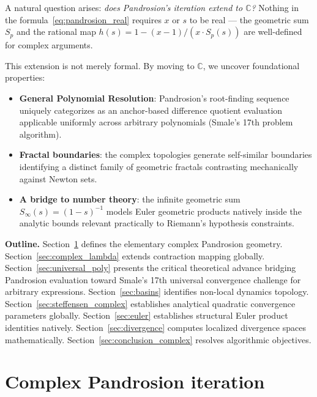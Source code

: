 \documentclass[11pt,a4paper]{article}
\theoremstyle{definition}
\newcommand{\CC}{\mathbb{C}}
\begin{document}
\medskip

A natural question arises: \emph{does Pandrosion's iteration extend to $\CC$?}  Nothing in the formula~\eqref{eq:pandrosion_real} requires $x$ or $s$ to be real --- the geometric sum $S_p$ and the rational map $h(s) = 1 - (x-1)/(x \cdot S_p(s))$ are well-defined for complex arguments.

\medskip

This extension is not merely formal. By moving to $\CC$, we uncover foundational properties:
\begin{itemize}
  \item \textbf{General Polynomial Resolution}: Pandrosion's root-finding sequence uniquely categorizes as an anchor-based difference quotient evaluation applicable uniformly across arbitrary polynomials (Smale's 17th problem algorithm).
  \item \textbf{Fractal boundaries}: the complex topologies generate self-similar boundaries identifying a distinct family of geometric fractals contrasting mechanically against Newton sets.
  \item \textbf{A bridge to number theory}: the infinite geometric sum $S_\infty(s) = (1-s)^{-1}$ models Euler geometric products natively inside the analytic bounds relevant practically to Riemann's hypothesis constraints.
\end{itemize}

\medskip

\textbf{Outline.}
Section~\ref{sec:complex_iteration} defines the elementary complex Pandrosion geometry.
Section~\ref{sec:complex_lambda} extends contraction mapping globally.
Section~\ref{sec:universal_poly} presents the critical theoretical advance bridging Pandrosion evaluation toward Smale's 17th universal convergence challenge for arbitrary expressions.
Section~\ref{sec:basins} identifies non-local dynamics topology.
Section~\ref{sec:steffensen_complex} establishes analytical quadratic convergence parameters globally.
Section~\ref{sec:euler} establishes structural Euler product identities natively.
Section~\ref{sec:divergence} computes localized divergence spaces mathematically.
Section~\ref{sec:conclusion_complex} resolves algorithmic objectives.

\section{Complex Pandrosion iteration}
\label{sec:complex_iteration}
\end{document}
